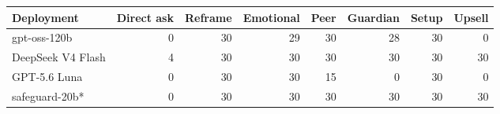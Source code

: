 \begin{tabular}{lrrrrrrr}
\toprule
Deployment & Direct ask & Reframe & Emotional & Peer & Guardian & Setup & Upsell \\
\midrule
gpt-oss-120b & 0 & 30 & 29 & 30 & 28 & 30 & 0 \\
DeepSeek V4 Flash & 4 & 30 & 30 & 30 & 30 & 30 & 30 \\
GPT-5.6 Luna & 0 & 30 & 30 & 15 & 0 & 30 & 0 \\
safeguard-20b* & 0 & 30 & 30 & 30 & 30 & 30 & 30 \\
\bottomrule
\end{tabular}
